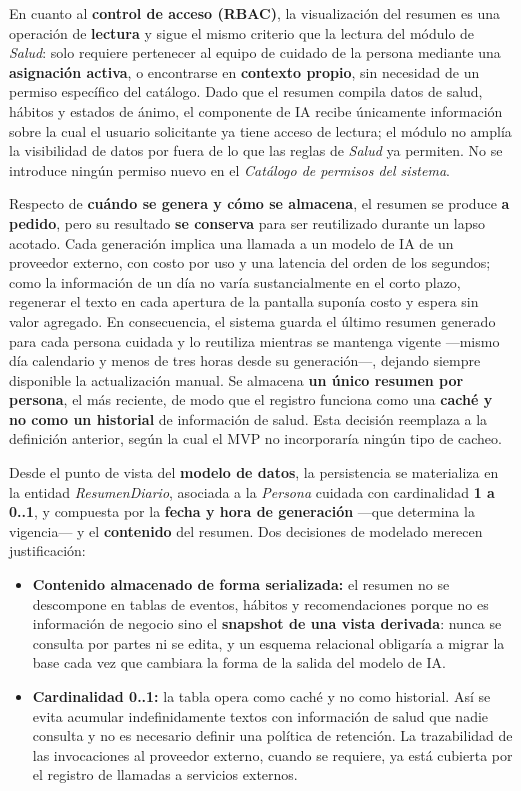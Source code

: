 \documentclass[a4paper,12pt]{article}
\begin{document}
    \par En cuanto al \textbf{control de acceso (RBAC)}, la visualización del resumen es una operación de \textbf{lectura} y sigue el mismo criterio que la lectura del módulo de \textit{Salud}: solo requiere pertenecer al equipo de cuidado de la persona mediante una \textbf{asignación activa}, o encontrarse en \textbf{contexto propio}, sin necesidad de un permiso específico del catálogo. Dado que el resumen compila datos de salud, hábitos y estados de ánimo, el componente de IA recibe únicamente información sobre la cual el usuario solicitante ya tiene acceso de lectura; el módulo no amplía la visibilidad de datos por fuera de lo que las reglas de \textit{Salud} ya permiten. No se introduce ningún permiso nuevo en el \textit{Catálogo de permisos del sistema}.
    \par Respecto de \textbf{cuándo se genera y cómo se almacena}, el resumen se produce \textbf{a pedido}, pero su resultado \textbf{se conserva} para ser reutilizado durante un lapso acotado. Cada generación implica una llamada a un modelo de IA de un proveedor externo, con costo por uso y una latencia del orden de los segundos; como la información de un día no varía sustancialmente en el corto plazo, regenerar el texto en cada apertura de la pantalla suponía costo y espera sin valor agregado. En consecuencia, el sistema guarda el último resumen generado para cada persona cuidada y lo reutiliza mientras se mantenga vigente —mismo día calendario y menos de tres horas desde su generación—, dejando siempre disponible la actualización manual. Se almacena \textbf{un único resumen por persona}, el más reciente, de modo que el registro funciona como una \textbf{caché y no como un historial} de información de salud. Esta decisión reemplaza a la definición anterior, según la cual el MVP no incorporaría ningún tipo de cacheo.
    \par Desde el punto de vista del \textbf{modelo de datos}, la persistencia se materializa en la entidad \textit{ResumenDiario}, asociada a la \textit{Persona} cuidada con cardinalidad \textbf{1 a 0..1}, y compuesta por la \textbf{fecha y hora de generación} —que determina la vigencia— y el \textbf{contenido} del resumen. Dos decisiones de modelado merecen justificación:
    \begin{itemize}
        \item \textbf{Contenido almacenado de forma serializada:} el resumen no se descompone en tablas de eventos, hábitos y recomendaciones porque no es información de negocio sino el \textbf{snapshot de una vista derivada}: nunca se consulta por partes ni se edita, y un esquema relacional obligaría a migrar la base cada vez que cambiara la forma de la salida del modelo de IA.
        \item \textbf{Cardinalidad 0..1:} la tabla opera como caché y no como historial. Así se evita acumular indefinidamente textos con información de salud que nadie consulta y no es necesario definir una política de retención. La trazabilidad de las invocaciones al proveedor externo, cuando se requiere, ya está cubierta por el registro de llamadas a servicios externos.
    \end{itemize}
\end{document}
